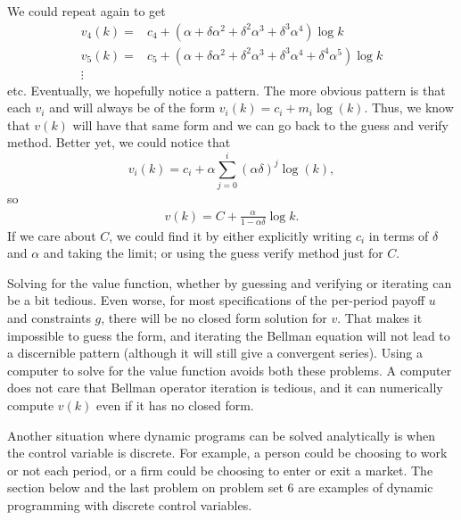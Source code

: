 \begin{example}
  We could repeat again to get 
  \begin{align*}
    v_4(k) = & c_4 + (\alpha + \delta \alpha^2 + \delta^2 \alpha^3 +
    \delta^3 \alpha^4) \log k \\
    v_5(k) = & c_5 + (\alpha + \delta \alpha^2 + \delta^2 \alpha^3 +
    \delta^3 \alpha^4 + \delta^4 \alpha^5) \log k \\
    \vdots
  \end{align*}
  etc. Eventually, we hopefully notice a pattern. The more obvious
  pattern is that each $v_i$ and will always be of the form $v_i(k) =
  c_i + m_i \log(k)$. Thus, we know that $v(k)$ will have that same
  form and we can go back to the guess and verify method. Better yet,
  we could notice that
  \[ v_i(k) = c_i + \alpha \sum_{j = 0}^i (\alpha \delta)^j \log(k),\]
  so 
  \begin{align*}
    v(k) = C + \frac{\alpha}{1-\alpha \delta} \log k.
  \end{align*}
  If we care about $C$, we could find it by either explicitly writing
  $c_i$ in terms of $\delta$ and $\alpha$ and taking the limit; or
  using the guess verify method just for $C$. 
\end{example}

Solving for the value function, whether by guessing and verifying or
iterating can be a bit tedious. Even worse, for most specifications of
the per-period payoff $u$ and constraints $g$, there will be no closed
form solution for $v$. That makes it impossible to guess the form, and
iterating the Bellman equation will not lead to a discernible pattern
(although it will still give a convergent series). Using a computer to
solve for the value function avoids both these problems. A computer
does not care that Bellman operator iteration is tedious, and it can
numerically compute $v(k)$ even if it has no closed form. 

Another situation where dynamic programs can be solved analytically is
when the control variable is discrete. For example, a person could be
choosing to work or not each period, or a firm could be choosing to
enter or exit a market. The section below and the last problem on
problem set 6 are examples of dynamic programming with discrete
control variables. 


\clearpage




